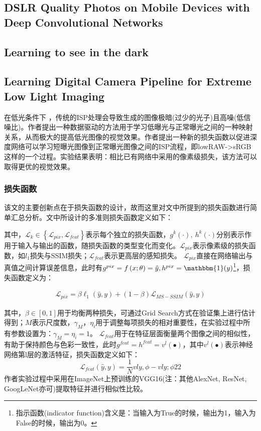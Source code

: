 \documentclass[letterpaper,12pt]{article}
\begin{document}
	\subsection{DSLR Quality Photos on Mobile Devices with Deep Convolutional Networks}
	\subsection{Learning to see in the dark}
	\subsection{Learning Digital Camera Pipeline for Extreme Low Light Imaging}
	
	在低光条件下 ，传统的ISP处理会导致生成的图像极暗(过少的光子)且高噪(低信噪比)。作者提出一种数据驱动的方法用于学习低曝光与正常曝光之间的一种映射关系，从而极大的提高低光图像的视觉效果。作者提出一种新的损失函数以促进深度网络可以学习短曝光图像到正常曝光图像之间的ISP流程，即lowRAW->sRGB这样的一个过程。实验结果表明：相比已有网络中采用的像素级损失，该方法可以取得更优的视觉效果。
	
		\subsubsection{损失函数}
		
		该文的主要创新点在于损失函数的设计，故而这里对文中所提到的损失函数进行简单汇总分析。文中所设计的多准则损失函数定义如下：
		
		其中，$\mathcal{L}_k\in\left\{\mathcal{L}_{pix},\mathcal{L}_{feat}\right\}$表示每个独立的损失函数，$g^k(\cdot),\ h^k(\cdot)$分别表示作用于输入与输出的函数，随损失函数的类型变化而变化。$\mathcal{L}_{pix}$表示像素级的损失函数，如$l_1$损失与SSIM损失；$\mathcal{L}_{feat}$表示更高层的感知损失。
		$\mathcal{L}_{pix}$直接在网络输出与真值之间计算误差信息，此时有$g^{pix}=f\left(x;\theta\right)=\hat{y},h^{pix}=\mathbbm{1}(y)$\footnote{指示函数(indicator function)含义是：当输入为True的时候，输出为1，输入为False的时候，输出为0。}，损失函数定义为：
		
		\begin{equation}
			\begin{aligned}
			\mathcal{L}_{pix}=\beta\ell_1\left(\hat{y},y\right)+\left(1-\beta\right)\mathcal{L}_{MS-SSIM}\left(\hat{y},y\right)
			\end{aligned}
		\end{equation}
		
		其中，$\beta\in\left[0,1\right]$用于均衡两种损失，可通过Grid Search方式在验证集上进行估计得到；$M$表示尺度数，$\gamma_M，\eta_i$用于调整每项损失的相对重要性，在实验过程中所有参数设置为：$\gamma_M=\eta_i=1$。
		$\mathcal{L}_{feat}$用于在特征层面衡量两个图像之间的相似性，有助于保持颜色与色彩一致性，此时$g^{feat}=h^{feat}=v^l(\bullet)$，其中$v^l(\bullet)$表示神经网络第l层的激活特征，损失函数定义如下：
		$$\mathcal{L}_{feat}\left(\hat{y},y\right)=\frac{1}{N}vly,ϕ-vly;ϕ22$$
		作者实验过程中采用在ImageNet上预训练的VGG16(注：其他AlexNet, ResNet, GoogLeNet亦可)提取特征并进行相似性比较。
		
\end{document}
